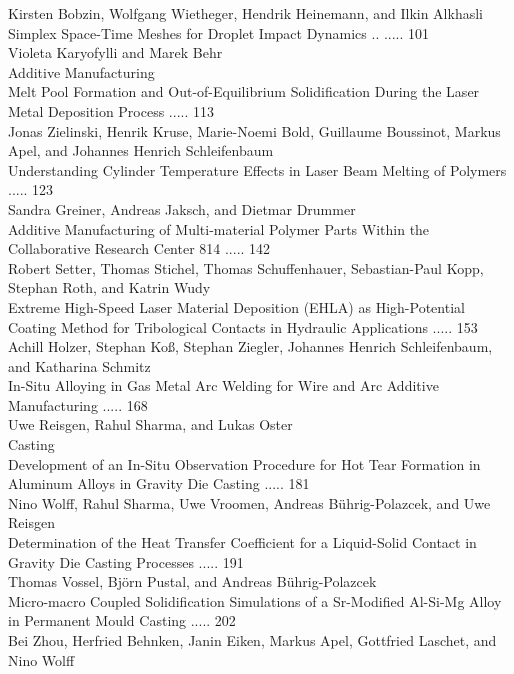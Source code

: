 \documentclass[10pt]{article}
\begin{document}
Kirsten Bobzin, Wolfgang Wietheger, Hendrik Heinemann, and Ilkin Alkhasli\\
Simplex Space-Time Meshes for Droplet Impact Dynamics .. ..... 101\\
Violeta Karyofylli and Marek Behr\\
Additive Manufacturing\\
Melt Pool Formation and Out-of-Equilibrium Solidification During the Laser Metal Deposition Process ..... 113\\
Jonas Zielinski, Henrik Kruse, Marie-Noemi Bold, Guillaume Boussinot, Markus Apel, and Johannes Henrich Schleifenbaum\\
Understanding Cylinder Temperature Effects in Laser Beam Melting of Polymers ..... 123\\
Sandra Greiner, Andreas Jaksch, and Dietmar Drummer\\
Additive Manufacturing of Multi-material Polymer Parts Within the Collaborative Research Center 814 ..... 142\\
Robert Setter, Thomas Stichel, Thomas Schuffenhauer, Sebastian-Paul Kopp, Stephan Roth, and Katrin Wudy\\
Extreme High-Speed Laser Material Deposition (EHLA) as High-Potential Coating Method for Tribological Contacts in Hydraulic Applications ..... 153\\
Achill Holzer, Stephan Koß, Stephan Ziegler, Johannes Henrich Schleifenbaum, and Katharina Schmitz\\
In-Situ Alloying in Gas Metal Arc Welding for Wire and Arc Additive Manufacturing ..... 168\\
Uwe Reisgen, Rahul Sharma, and Lukas Oster\\
Casting\\
Development of an In-Situ Observation Procedure for Hot Tear Formation in Aluminum Alloys in Gravity Die Casting ..... 181\\
Nino Wolff, Rahul Sharma, Uwe Vroomen, Andreas Bührig-Polazcek, and Uwe Reisgen\\
Determination of the Heat Transfer Coefficient for a Liquid-Solid Contact in Gravity Die Casting Processes ..... 191\\
Thomas Vossel, Björn Pustal, and Andreas Bührig-Polazcek\\
Micro-macro Coupled Solidification Simulations of a Sr-Modified Al-Si-Mg Alloy in Permanent Mould Casting ..... 202\\
Bei Zhou, Herfried Behnken, Janin Eiken, Markus Apel, Gottfried Laschet, and Nino Wolff\\
\end{document}

